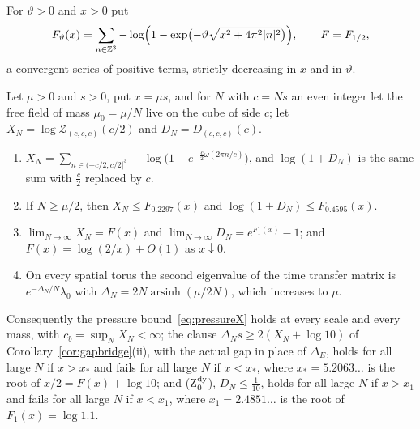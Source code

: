 For $\vartheta>0$ and $x>0$ put
\begin{equation}\label{eq:Fdef}
F_\vartheta(x)=\sum_{n\in\mathbb{Z}^3}-\log\Bigl(1-\exp\bigl(-\vartheta\sqrt{x^2+4\pi^2
|n|^2}\bigr)\Bigr),\qquad F=F_{1/2},
\end{equation}
a convergent series of positive terms, strictly decreasing in $x$ and in
$\vartheta$.

\begin{theorem}\label{thm:pressfree}
Let $\mu>0$ and $s>0$, put $x=\mu s$, and for $N$ with $c=Ns$ an even integer
let the free field of mass $\mu_0=\mu/N$ live on the cube of side $c$; let
$X_N=\log\mathcal Z_{(c,c,c)}(c/2)$ and $D_N=D_{(c,c,c)}(c)$.
\begin{enumerate}[label=\textup{(\roman*)},leftmargin=*]
\item $X_N=\sum_{n\in(-c/2,c/2]^3}-\log\bigl(1-e^{-\frac c2\omega(2\pi n/c)}
\bigr)$, and $\log(1+D_N)$ is the same sum with $\frac c2$ replaced by $c$.
\item If $N\ge\mu/2$, then $X_N\le F_{0.2297}(x)$ and $\log(1+D_N)\le
F_{0.4595}(x)$.
\item $\lim_{N\to\infty}X_N=F(x)$ and $\lim_{N\to\infty}D_N=e^{F_1(x)}-1$; and
$F(x)=\log(2/x)+O(1)$ as $x\downarrow0$.
\item On every spatial torus the second eigenvalue of the time transfer
matrix is $e^{-\Delta_N/N}\lambda_0$ with $\Delta_N=2N\operatorname{arsinh}
(\mu/2N)$, which increases to $\mu$.
\end{enumerate}
Consequently the pressure bound~\eqref{eq:pressureX} holds at every scale and
every mass, with $c_b=\sup_NX_N<\infty$; the clause $\Delta_Ns\ge2(X_N+\log
10)$ of Corollary~\ref{cor:gapbridge}\textup{(ii)}, with the actual gap in
place of $\Delta_E$, holds for all large $N$ if $x>x_*$ and fails for all
large $N$ if $x<x_*$, where $x_*=5.2063\ldots$ is the root of $x/2=F(x)+\log
10$; and \textup{(Z$_0^{\rm dy}$)}, $D_N\le\frac1{10}$, holds for all large
$N$ if $x>x_1$ and fails for all large $N$ if $x<x_1$, where $x_1=2.4851\ldots$
is the root of $F_1(x)=\log1.1$.
\end{theorem}

